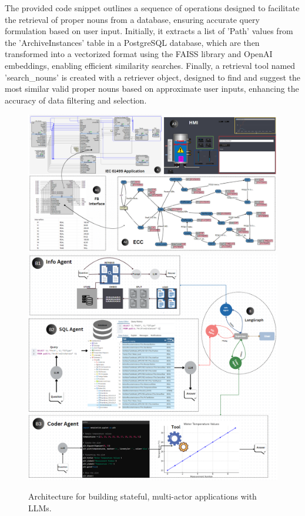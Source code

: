\begin{bibunit}
The provided code snippet outlines a sequence of operations designed to facilitate the retrieval of proper nouns from a database, ensuring accurate query formulation based on user input. Initially, it extracts a list of 'Path' values from the 'ArchiveInstances' table in a PostgreSQL database, which are then transformed into a vectorized format using the FAISS library and OpenAI embeddings, enabling efficient similarity searches. Finally, a retrieval tool named 'search\_nouns' is created with a retriever object, designed to find and suggest the most similar valid proper nouns based on approximate user inputs, enhancing the accuracy of data filtering and selection.


\begin{figure}
    \centering
    \includegraphics[width=.8\textwidth]{MX_Papers/Paper12/images/IEC61499App.PNG}
    \includegraphics[width=.8\textwidth]{MX_Papers/Paper12/images/LangGraph.PNG}
    \caption{Architecture for building stateful, multi-actor applications with LLMs.}
    \label{fig:Architecture}
\end{figure}



\end{bibunit}
